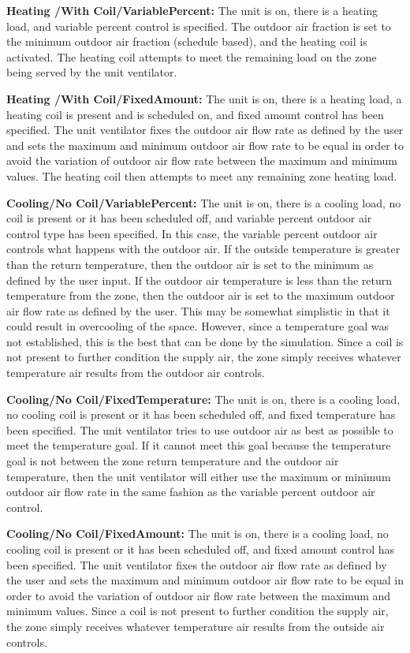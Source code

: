 \textbf{Heating /With Coil/VariablePercent:} The unit is on, there is a heating load, and variable percent control is specified. The outdoor air fraction is set to the minimum outdoor air fraction (schedule based), and the heating coil is activated. The heating coil attempts to meet the remaining load on the zone being served by the unit ventilator.

\textbf{Heating /With Coil/FixedAmount:} The unit is on, there is a heating load, a heating coil is present and is scheduled on, and fixed amount control has been specified. The unit ventilator fixes the outdoor air flow rate as defined by the user and sets the maximum and minimum outdoor air flow rate to be equal in order to avoid the variation of outdoor air flow rate between the maximum and minimum values. The heating coil then attempts to meet any remaining zone heating load.

\textbf{Cooling/No Coil/VariablePercent:} The unit is on, there is a cooling load, no coil is present or it has been scheduled off, and variable percent outdoor air control type has been specified. In this case, the variable percent outdoor air controls what happens with the outdoor air. If the outside temperature is greater than the return temperature, then the outdoor air is set to the minimum as defined by the user input. If the outdoor air temperature is less than the return temperature from the zone, then the outdoor air is set to the maximum outdoor air flow rate as defined by the user. This may be somewhat simplistic in that it could result in overcooling of the space. However, since a temperature goal was not established, this is the best that can be done by the simulation. Since a coil is not present to further condition the supply air, the zone simply receives whatever temperature air results from the outdoor air controls.

\textbf{Cooling/No Coil/FixedTemperature:} The unit is on, there is a cooling load, no cooling coil is present or it has been scheduled off, and fixed temperature has been specified. The unit ventilator tries to use outdoor air as best as possible to meet the temperature goal. If it cannot meet this goal because the temperature goal is not between the zone return temperature and the outdoor air temperature, then the unit ventilator will either use the maximum or minimum outdoor air flow rate in the same fashion as the variable percent outdoor air control.

\textbf{Cooling/No Coil/FixedAmount:} The unit is on, there is a cooling load, no cooling coil is present or it has been scheduled off, and fixed amount control has been specified. The unit ventilator fixes the outdoor air flow rate as defined by the user and sets the maximum and minimum outdoor air flow rate to be equal in order to avoid the variation of outdoor air flow rate between the maximum and minimum values. Since a coil is not present to further condition the supply air, the zone simply receives whatever temperature air results from the outside air controls.

